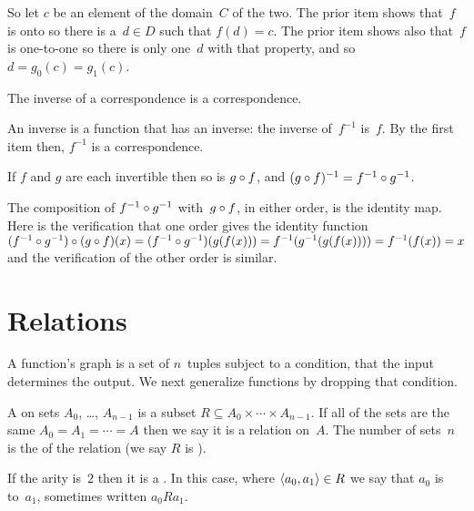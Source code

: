 \documentclass{ibl}  %
\begin{document}
\begin{problem}
\begin{exes}
\begin{answer}
  So let $c$ be an element of the domain~$C$ of the two.
  The prior item shows that~$f$ is onto so there is a~$d\in D$ such that
  $f(d)=c$.
  The prior item shows also that~$f$ is one-to-one so there is only 
  one~$d$ with that property, and so $d=g_0(c)=g_1(c)$.  
\end{answer}
\begin{exercise} 
  The inverse of a correspondence is a correspondence.  
\end{exercise}
\begin{answer}
  An inverse is a function that has an inverse: the inverse of~$f^{-1}$
  is~$f$.
  By the first item then, $f^{-1}$ is a correspondence.  
\end{answer}
\begin{exercise} 
  If $f$ and $g$ are each invertible then so is 
  $g\mathbin{\circ} f$, and $(g\mathbin{\circ} f)^{-1}=f^{-1}\mathbin{\circ} g^{-1}$.
\end{exercise}
\begin{answer}
  The composition of $f^{-1}\mathbin{\circ} g^{-1}$ with~$g\mathbin{\circ} f$,
  in either order, is the identity map.
  Here is the verification that one order gives the identity function   
  $(f^{-1}\mathbin{\circ} g^{-1})\mathbin{\circ} (g\mathbin{\circ} f)(x)
  =(f^{-1}\mathbin{\circ} g^{-1})(g(f(x)))
  =f^{-1}(g^{-1}(g(f(x))))
  =f^{-1}(f(x))=x$
  and the verification of the other order is similar.  
\end{answer}
\end{exes}
\end{problem}





\section{Relations}
A function's graph is a set of $n$~tuples
subject to a condition, that the input determines the output.
We next generalize functions by dropping that condition.  

\begin{df}
A  on sets $A_0$, \ldots, $A_{n-1}$ is a subset
$R\subseteq A_0\times \cdots \times A_{n-1}$. 
If all of the sets are the same $A_0=A_1=\cdots =A$
then we say it is a relation on~$A$.
The number of sets~$n$ is the  of the relation
(we say $R$ is ).

If the arity is~$2$ then it is a .
In this case, where $\langle a_0,a_1\rangle\in R$ we say 
that $a_0$ is~ to~$a_1$,
sometimes written $a_0Ra_1$.
\end{df}
\end{document}
